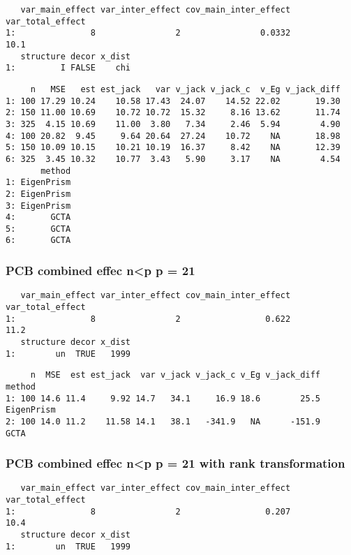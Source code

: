 \documentclass[]{article}
\begin{document}
\begin{verbatim}
   var_main_effect var_inter_effect cov_main_inter_effect var_total_effect
1:               8                2                0.0332             10.1
   structure decor x_dist
1:         I FALSE    chi
\end{verbatim}

\begin{verbatim}
     n   MSE   est est_jack   var v_jack v_jack_c  v_Eg v_jack_diff
1: 100 17.29 10.24    10.58 17.43  24.07    14.52 22.02       19.30
2: 150 11.00 10.69    10.72 10.72  15.32     8.16 13.62       11.74
3: 325  4.15 10.69    11.00  3.80   7.34     2.46  5.94        4.90
4: 100 20.82  9.45     9.64 20.64  27.24    10.72    NA       18.98
5: 150 10.09 10.15    10.21 10.19  16.37     8.42    NA       12.39
6: 325  3.45 10.32    10.77  3.43   5.90     3.17    NA        4.54
       method
1: EigenPrism
2: EigenPrism
3: EigenPrism
4:       GCTA
5:       GCTA
6:       GCTA
\end{verbatim}

\subsubsection{PCB combined effec n\textless{}p p =
21}\label{pcb-combined-effec-np-p-21}

\begin{verbatim}
   var_main_effect var_inter_effect cov_main_inter_effect var_total_effect
1:               8                2                 0.622             11.2
   structure decor x_dist
1:        un  TRUE   1999
\end{verbatim}

\begin{verbatim}
     n  MSE  est est_jack  var v_jack v_jack_c v_Eg v_jack_diff     method
1: 100 14.6 11.4     9.92 14.7   34.1     16.9 18.6        25.5 EigenPrism
2: 100 14.0 11.2    11.58 14.1   38.1   -341.9   NA      -151.9       GCTA
\end{verbatim}

\subsubsection{PCB combined effec n\textless{}p p = 21 with rank
transformation}\label{pcb-combined-effec-np-p-21-with-rank-transformation}

\begin{verbatim}
   var_main_effect var_inter_effect cov_main_inter_effect var_total_effect
1:               8                2                 0.207             10.4
   structure decor x_dist
1:        un  TRUE   1999
\end{verbatim}
\end{document}
